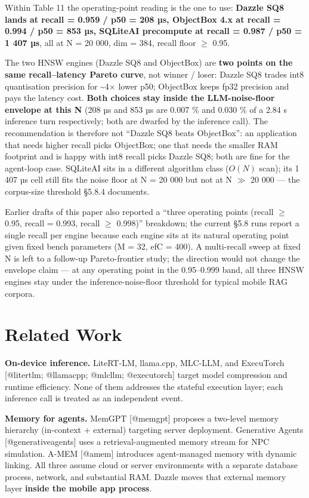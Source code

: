 Within Table 11 the operating-point reading is the one to use: \textbf{Dazzle
SQ8 lands at recall = 0.959 / p50 = 208 µs, ObjectBox 4.x at recall = 0.994 /
p50 = 853 µs, SQLiteAI precompute at recall = 0.987 / p50 = 1 407 µs}, all at N
= 20 000, dim = 384, recall floor \(\geq\) 0.95.

The two HNSW engines (Dazzle SQ8 and ObjectBox) are \textbf{two points on the
same recall--latency Pareto curve}, not winner / loser: Dazzle SQ8 trades int8
quantisation precision for \textasciitilde4× lower p50; ObjectBox keeps fp32
precision and pays the latency cost. \textbf{Both choices stay inside the
LLM-noise-floor envelope at this N} (208 µs and 853 µs are 0.007 \% and 0.030 \%
of a 2.84 s inference turn respectively; both are dwarfed by the inference
call). The recommendation is therefore not ``Dazzle SQ8 beats ObjectBox'': an
application that needs higher recall picks ObjectBox; one that needs the smaller
RAM footprint and is happy with int8 recall picks Dazzle SQ8; both are fine for
the agent-loop case. SQLiteAI sits in a different algorithm class (\(O(N)\)
scan); its 1 407 µs cell still fits the noise floor at N = 20 000 but not at N
\(\gg\) 20 000 --- the corpus-size threshold §5.8.4 documents.

Earlier drafts of this paper also reported a ``three operating points (recall
\(\geq\) 0.95, recall = 0.993, recall \(\geq\) 0.998)'' breakdown; the current
§5.8 runs report a single recall per engine because each engine sits at its
natural operating point given fixed bench parameters (M = 32, efC = 400). A
multi-recall sweep at fixed N is left to a follow-up Pareto-frontier study; the
direction would not change the envelope claim --- at any operating point in the
0.95--0.999 band, all three HNSW engines stay under the inference-noise-floor
threshold for typical mobile RAG corpora.

\section{Related Work}\label{related-work}

\textbf{On-device inference.} LiteRT-LM, llama.cpp, MLC-LLM, and ExecuTorch
{[}@litertlm; @llamacpp; @mlcllm; @executorch{]} target model compression and
runtime efficiency. None of them addresses the stateful execution layer; each
inference call is treated as an independent event.

\textbf{Memory for agents.} MemGPT {[}@memgpt{]} proposes a two-level memory
hierarchy (in-context + external) targeting server deployment. Generative Agents
{[}@generativeagents{]} uses a retrieval-augmented memory stream for NPC
simulation. A-MEM {[}@amem{]} introduces agent-managed memory with dynamic
linking. All three assume cloud or server environments with a separate database
process, network, and substantial RAM. Dazzle moves that external memory layer
\textbf{inside the mobile app process}.

